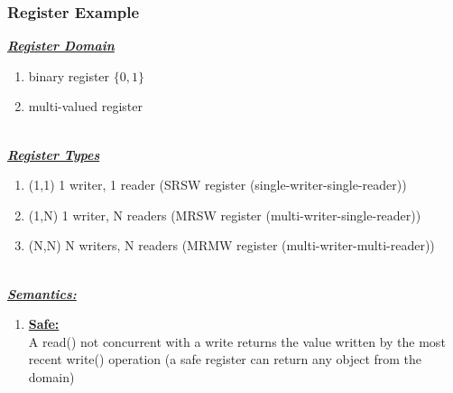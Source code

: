 \documentclass{article}
\begin{document}
\begin{adjustwidth}{2em}{2em}
\begin{adjustwidth}{2em}{2em}
			\subsubsection{Register Example}
			\begin{adjustwidth}{2em}{}
				\underline{\textbf{\textit{Register Domain}}}
				\begin{enumerate}[-]
					\item binary register $\{ 0,1 \}$
					\item multi-valued register
				\end{enumerate}
				\hfill \\
				\underline{\textbf{\textit{Register Types}}}
				\begin{enumerate}[-]
					\item (1,1) 1 writer, 1 reader (SRSW register (single-writer-single-reader))
					\item (1,N) 1 writer, N readers (MRSW register (multi-writer-single-reader))
					\item (N,N) N writers, N readers (MRMW register (multi-writer-multi-reader))
				\end{enumerate}
				\hfill \\
				\underline{\textbf{\textit{Semantics:}}}
				\begin{enumerate}[]
					\item \underline{\textbf{Safe:}} \\
					A read() not concurrent with a write returns the value written by the most recent write() operation (a safe register can return any object from the domain)
				\end{enumerate}
			\end{adjustwidth}

\end{adjustwidth}
\end{adjustwidth}
\end{document}

